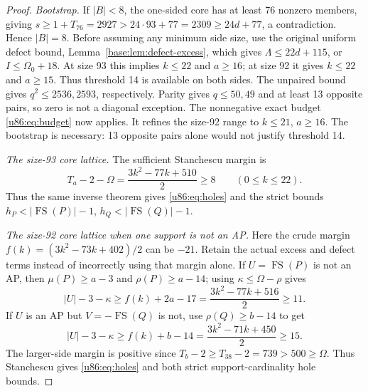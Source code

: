 \documentclass[11pt,a4paper]{article}
\theoremstyle{remark}
\newcommand{\FS}{\operatorname{FS}}
\begin{document}
\begin{proof}
\emph{Bootstrap.}
If $|B|<8$, the one-sided core has at least 76 nonzero members, giving
$s\ge1+T_{76}=2927>24\cdot93+77=2309\ge24d+77$, a contradiction.
Hence $|B|=8$. Before assuming any minimum side size, use the original
uniform defect bound, Lemma~\ref{base:lem:defect-excess}, which gives
$\Lambda\le22d+115$, or $I\le\Omega_0+18$.
At size 93 this implies $k\le22$ and $a\ge16$; at size 92 it gives
$k\le22$ and $a\ge15$. Thus threshold 14 is available on both sides.
The unpaired bound gives $q^2\le2536,2593$, respectively. Parity gives
$q\le50,49$ and at least 13 opposite pairs, so zero is not a diagonal
exception. The nonnegative exact budget \eqref{u86:eq:budget} now applies.
It refines the size-92 range to $k\le21$, $a\ge16$.
The bootstrap is necessary: 13 opposite pairs alone would not justify
threshold 14.

\emph{The size-93 core lattice.}
The sufficient Stanchescu margin is
\[
 T_a-2-\Omega=\frac{3k^2-77k+510}{2}\ge8\qquad(0\le k\le22).
\]
Thus the same inverse theorem gives \eqref{u86:eq:holes} and the strict
bounds $h_P<|\FS(P)|-1$, $h_Q<|\FS(Q)|-1$.

\emph{The size-92 core lattice when one support is not an AP.}
Here the crude margin
$f(k)=(3k^2-73k+402)/2$ can be $-21$. Retain the actual excess and defect
terms instead of incorrectly using that margin alone. If
$U=\FS(P)$ is not an AP, then $\mu(P)\ge a-3$ and $\rho(P)\ge a-14$;
using $\kappa\le\Omega-\rho$ gives
\[
 |U|-3-\kappa\ge f(k)+2a-17
 =\frac{3k^2-77k+516}{2}\ge11.
\]
If $U$ is an AP but $V=-\FS(Q)$ is not, use $\rho(Q)\ge b-14$ to get
\[
 |U|-3-\kappa\ge f(k)+b-14
 =\frac{3k^2-71k+450}{2}\ge15.
\]
The larger-side margin is positive since
$T_b-2\ge T_{38}-2=739>500\ge\Omega$. Thus Stanchescu gives
\eqref{u86:eq:holes} and both strict support-cardinality hole bounds.


\end{proof}
\end{document}

